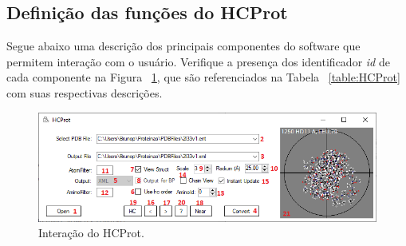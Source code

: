 \subsection*{Definição das funções do HCProt}
Segue abaixo uma descrição dos principais componentes do software que permitem interação com o usuário. Verifique a presença dos identificador \textit{id} de cada componente na Figura ~\ref{fig:HCProt}, que são referenciados na Tabela ~\ref{table:HCProt} com suas respectivas descrições.

\begin{figure}[H]
	\begin{center}
		\includegraphics[width=1\linewidth]{secProteins/figures/HCProt.png}
	\end{center}
	\caption{Interação do HCProt.}
	\label{fig:HCProt}
\end{figure}

